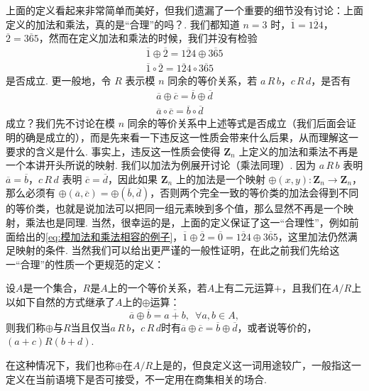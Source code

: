 上面的定义看起来非常简单而美好，但我们遗漏了一个重要的细节没有讨论：上面定义的加法和乘法，真的是``合理''的吗？. 我们都知道 $n = 3$ 时，$\overline{1} = \overline{124}$，$\overline{2} = \overline{365}$，然而在定义加法和乘法的时候，我们并没有检验
\begin{gather} \label{eq:模加法和乘法相容的例子}
    \overline{1} \oplus \overline{2} = \overline{124} \oplus \overline{365} \\
    \overline{1} \circ \overline{2} = \overline{124} \circ \overline{365}
\end{gather}
是否成立. 更一般地，令 $R$ 表示模 $n$ 同余的等价关系，若 $a\,R\,b$，$c\,R\,d$，是否有
\begin{gather*}
    \overline{a} \oplus \overline{c} = \overline{b} \oplus \overline{d} \\
    \overline{a} \circ \overline{c} = \overline{b} \circ \overline{d}
\end{gather*}
成立？我们先不讨论在模 $n$ 同余的等价关系中上述等式是否成立（我们后面会证明的确是成立的），而是先来看一下违反这一性质会带来什么后果，从而理解这一要求的含义是什么. 事实上，违反这一性质会使得 $\mathbf{Z}_n$ 上定义的加法和乘法不再是一个本讲开头所说的映射. 我们以加法为例展开讨论（乘法同理）. 因为 $a\,R\,b$ 表明 $\overline{a} = \overline{b}$，$c\,R\,d$ 表明 $\overline{c} = \overline{d}$，因此如果 $\mathbf{Z}_n$ 上的加法是一个映射 $\oplus(x,y) \colon \mathbf{Z}_n \to \mathbf{Z}_n$，那么必须有 $\oplus(\overline{a},\overline{c}) = \oplus(\overline{b},\overline{d})$，否则两个完全一致的等价类的加法会得到不同的等价类，也就是说加法可以把同一组元素映到多个值，那么显然不再是一个映射，乘法也是同理. 当然，很幸运的是，上面的定义保证了这一``合理性''，例如前面给出的\autoref{eq:模加法和乘法相容的例子}，$\overline{1} \oplus \overline{2} = \overline{0} = \overline{124} \oplus \overline{365}$，这里加法仍然满足映射的条件. 当然我们可以给出更严谨的一般性证明，在此之前我们先给这一``合理''的性质一个更规范的定义：
\begin{definition}{}{}
    设$A$是一个集合，$R$是$A$上的一个等价关系，若$A$上有二元运算$+$，且我们在$A/R$上以如下自然的方式继承了$A$上的$\oplus$运算：
    \[\overline{a}\oplus\overline{b}=\overline{a+b},\enspace\forall a,b\in A,\]
    则我们称$\oplus$与$R$当且仅当$a\,R\,b$，$c\,R\,d$时有$\overline{a}\oplus\overline{c}=\overline{b}\oplus\overline{d}$，或者说等价的，$(a+c)R(b+d)$.
\end{definition}

在这种情况下，我们也称$\oplus$在$A/R$上是的，但良定义这一词用途较广，一般指这一定义在当前语境下是否可接受，不一定用在商集相关的场合.

